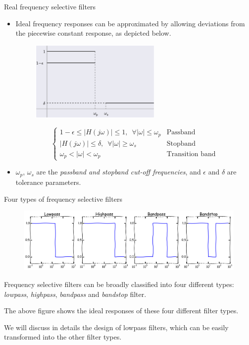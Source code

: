 \documentclass{beamer}
\begin{document}
\begin{frame}{Real frequency selective filters}
\begin{itemize}
\item Ideal frequency responses can be approximated by allowing deviations from the piecewise constant response, as depicted below.
\begin{figure}
\centering
\includegraphics[width=0.6\textwidth]{img/real_filt.eps}
\end{figure}
\[\begin{cases}
1-\epsilon \leq |H(j\omega)| \leq 1, \,\,\, \forall |\omega| \leq \omega_p & \text{Passband} \\
|H(j\omega)| \leq \delta, \,\,\, \forall |\omega| \geq \omega_s & \text{Stopband} \\
\omega_p < |\omega| < \omega_p & \text{Transition band}
\end{cases} \]
\item $\omega_p$, $\omega_s$ are the \textit{passband and stopband cut-off frequencies}, and $\epsilon$ and $\delta$ are tolerance parameters. 
\end{itemize}
\end{frame}

\begin{frame}{Four types of frequency selective filters}
\begin{figure}
\centering
\includegraphics[width=\textwidth]{img/filters.png}
\end{figure}

Frequency selective filters can be broadly classified into four different types: \textit{lowpass}, \textit{highpass}, \textit{bandpass} and \textit{bandstop} filter.

The above figure shows the ideal responses of these four different filter types.

We will discuss in details the design of lowpass filters, which can be easily transformed into the other filter types.
\end{frame}
\end{document}
